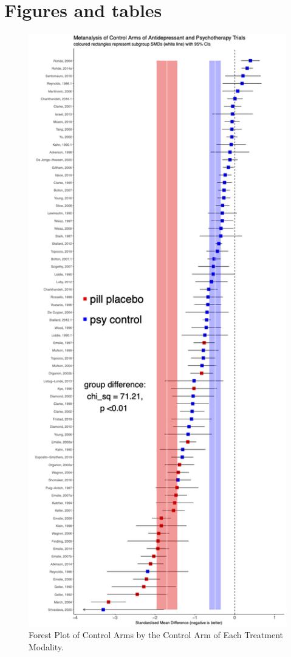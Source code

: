 \documentclass[
  super,
  preprint,
  3p]{elsarticle}
\begin{document}
\hypertarget{figures-and-tables}{%
\section{Figures and tables}\label{figures-and-tables}}

\begin{figure}

\includegraphics[width=12.5in,height=\textheight]{forestplot.png} \hfill{}

\caption{Forest Plot of Control Arms by the Control Arm of Each
Treatment Modality.}

\end{figure}
\end{document}
